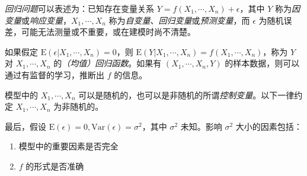 \documentclass[../main.tex]{subfiles}
\begin{document}
\emph{回归问题}可以表述为：已知存在变量关系 $Y=f(X_1,\cdots,X_n)+\epsilon$，其中 $Y$ 称为\emph{因变量}或\emph{响应变量}，$X_1,\cdots,X_n$ 称为\emph{自变量}、\emph{回归变量}或\emph{预测变量}，而 $\epsilon$ 为随机误差，可能无法测量或不重要，或在建模时尚不清楚。

如果假定 $\mathrm E(\epsilon|X_1,\cdots,X_n)=0$，则 $\mathrm E(Y|X_1,\cdots,X_n)=f(X_1,\cdots,X_n)$，称为 $Y$ 对 $X_1,\cdots,X_n$ 的\emph{（均值）回归函数}。如果有 $(X_1,\cdots,X_n,Y)$ 的样本数据，则可以通过有监督的学习，推断出 $f$ 的信息。

模型中的 $X_1,\cdots,X_n$ 可以是随机的，也可以是非随机的所谓\emph{控制变量}。以下一律约定 $X_1,\cdots,X_n$ 为非随机的。

最后，假设 $\mathrm E(\epsilon)=0,\mathrm{Var}(\epsilon)=\sigma^2$，其中 $\sigma^2$ 未知。影响 $\sigma^2$ 大小的因素包括：
\begin{enumerate}
    \item 模型中的重要因素是否完全
    \item $f$ 的形式是否准确
\end{enumerate}
\end{document}
